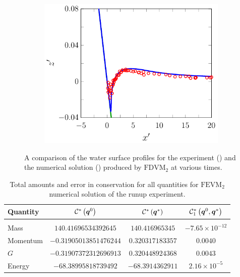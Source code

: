 \begin{figure}
\begin{subfigure}{0.5\textwidth}
		\includegraphics[width=\textwidth]{./chp6/figures/Experiment/Synolakis/H0p0185/FDVM/70s.pdf}
	\end{subfigure}
	\caption{A comparison of the water surface profiles for the experiment () and the numerical solution ({\color{blue}\solidrule}) produced by $\text{FDVM}_2$ at various times.}
	\label{fig:SynolakisFDVMNoBreak}
\end{figure}

\begin{table}
	\centering
	\begin{tabular}{l  c  c c}
		Quantity& $\mathcal{C}^*\left(\boldsymbol{q}^0\right)$ & $\mathcal{C}^*\left(\boldsymbol{q}^*\right)$ & $\mathcal{C}^*_1\left(\boldsymbol{q}^0,\boldsymbol{q}^*\right)$ \\
		\hline &&& \\
		Mass & $140.41696534392645$ & $140.416965345$ & $-7.65\times 10^{-12}$\\
		Momentum & $-0.31905013851476244$ & $0.320317183357$ & $0.0040$\\
		$G$ & $-0.31907372312696913$ & $0.320448924368$ & $0.0043$\\
		Energy & $-68.38995818739492$ & $-68.3914362911 $ & $2.16 \times 10^{-5}$ \\
	\end{tabular}
	\caption{Total amounts and error in conservation for all quantities for $\text{FEVM}_2$ numerical solution of the runup experiment.}
	\label{tab:ConservationSynFEVM}
\end{table}

